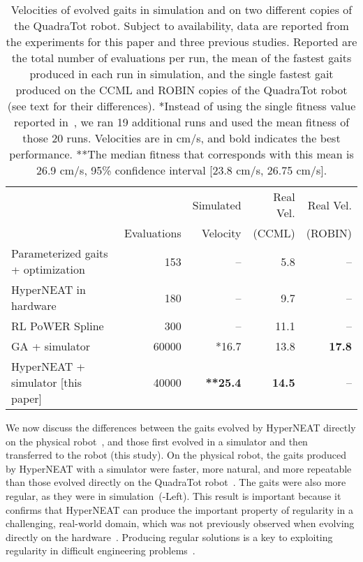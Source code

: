 \begin{table}
\begin{center}
\begin{tabular}{|l|r|r|r|r|}
\hline
                                         &              & Simulated  & Real Vel. & Real Vel.  \\
                                         & Evaluations  & Velocity &    (CCML)     & (ROBIN) \\
\hline
Parameterized gaits + optimization \cite{yos:clune}   &153    & --    & 5.8 & --\\
\hline
HyperNEAT in hardware \cite{yos:clune}                 & 180         & --         &   9.7  & --   \\
\hline
RL PoWER Spline \cite{haocheng}                         & 300         & --         &   11.1 & --\\
\hline
GA + simulator \cite{glette}             & 60000       & *16.7       &   13.8   & \textbf{17.8}  \\
\hline
HyperNEAT + simulator [this paper]                     & 40000       & \textbf{**25.4}       &   \textbf{14.5} & --\\
\hline
\end{tabular}
\vspace{.35cm}
\caption{Velocities of evolved gaits in simulation and on two different copies of the QuadraTot robot. Subject to availability, data are reported from the experiments for this paper and three previous studies. Reported are the total number of evaluations per run, the mean of the fastest gaits produced in each run in simulation, and the single fastest gait produced on the CCML and ROBIN copies of the QuadraTot robot (see text for their differences). *Instead of using the single fitness value reported in~\cite{glette}, we ran 19 additional runs and used the mean fitness of those 20 runs. Velocities are in cm/s, and bold indicates the best performance. **The median fitness that corresponds with this mean is 26.9 cm/s, 95\% confidence interval [23.8 cm/s, 26.75 cm/s].}  
\end{center}
\end{table}

We now discuss the differences between the gaits evolved by HyperNEAT directly on the physical robot~\cite{yos:clune}, and those first evolved in a simulator and then transferred to the robot (this study). 
On the physical robot, the gaits produced by HyperNEAT with a simulator were faster, more natural, and more repeatable than those evolved directly on the QuadraTot robot~\cite{yos:clune}. The gaits were also more regular, as they were in simulation~(-Left). This result is important because it confirms that HyperNEAT can produce the important property of
regularity in a challenging, real-world domain, which was not previously observed when
evolving directly on the hardware~\cite{yos:clune}. Producing regular solutions is a key to exploiting regularity in difficult engineering problems~\cite{clune2011performance}. 



